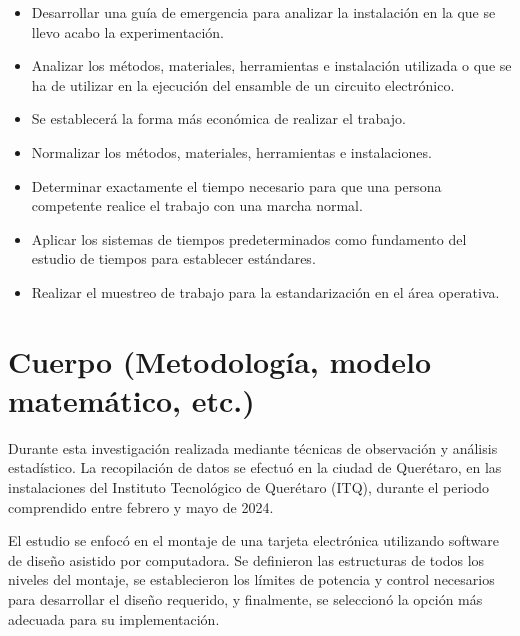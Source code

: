     \begin{itemize}
    \item Desarrollar una guía de emergencia para analizar la instalación en la que se llevo acabo la experimentación.
     \item Analizar los métodos, materiales, herramientas e instalación utilizada o que se ha de utilizar en la ejecución del ensamble de un circuito electrónico.
    \item Se establecerá la forma más económica de realizar el trabajo.
    \item Normalizar los métodos, materiales, herramientas e instalaciones.
    \item Determinar exactamente el tiempo necesario para que una persona competente realice el trabajo con una marcha normal.
    \item Aplicar los sistemas de tiempos predeterminados como fundamento del estudio de tiempos para establecer estándares.
    \item Realizar el muestreo de trabajo para la estandarización en el área operativa.
        
    \end{itemize}
    
    \section{Cuerpo (Metodología, modelo matemático, etc.)}
    Durante esta investigación realizada mediante técnicas de observación y análisis estadístico. La recopilación de datos se efectuó en la ciudad de Querétaro, en las instalaciones del Instituto Tecnológico de Querétaro (ITQ), durante el periodo comprendido entre febrero y mayo de 2024.

    El estudio se enfocó en el montaje de una tarjeta electrónica utilizando software de diseño asistido por computadora. Se definieron las estructuras de todos los niveles del montaje, se establecieron los límites de potencia y control necesarios para desarrollar el diseño requerido, y finalmente, se seleccionó la opción más adecuada para su implementación.

